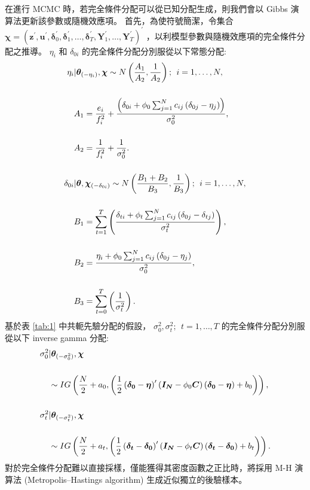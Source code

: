 \documentclass[12pt,a4paper]{article}
\begin{document}
\begin{CJK}{UTF8}{bkai}
在進行 MCMC 時，若完全條件分配可以從已知分配生成，則我們會以 Gibbs 演算法更新該參數或隨機效應項。
首先，為使符號簡潔，令集合 $\bm{\chi} = \left(\bm{z}^\prime,\bm{u}^\prime,\bm{\delta}_0^\prime,\bm{\delta}_1^\prime,\dots,\bm{\delta}_T^\prime,\bm{Y}_1^\prime,\ldots,\bm{Y}_T^\prime\right)^\prime$ ，以利模型參數與隨機效應項的完全條件分配之推導。
 $\eta_i$ 和 $\delta_{0i}$ 的完全條件分配分別服從以下常態分配:
 \begin{align*}
 \setlength\abovedisplayskip{25pt}
 \setlength\belowdisplayskip{25pt}
 \eta_i & |\bm{\theta}_{(-\eta_i)},\bm{\chi} \sim N\left( \frac{A_1}{A_2},\frac{1}{A_2}\right);\:\:i=1,\dots,N, \\[5mm]
 & A_1 = \frac{e_i}{f_i^2} + \frac{\left(\delta_{0i}+\phi_0\sum_{j=1}^N c_{ij}\left(\delta_{0j}-\eta_j\right)\right)}{\sigma_0^2}, \\[5mm]
 & A_2 = \frac{1}{f_i^2}+\frac{1}{\sigma_0^2}.\\[5mm]
 \delta_{0i} & |\bm{\theta},\bm{\chi}_{(-\delta_{0i})} \sim N\left( \frac{B_1+B_2}{B_3},\frac{1}{B_3}\right);\:\:i=1,\dots,N, \\[5mm]
 & B_1 =  \sum_{t=1}^T\left( \frac{\delta_{ti}+\phi_t \sum_{j=1}^N c_{ij}\left( \delta_{0j}-\delta_{tj} \right)}{\sigma_t^2} \right), \\[5mm]
 & B_2 =  \frac{\eta_i+\phi_0 \sum_{j=1}^N c_{ij}\left(\delta_{0j}-\eta_j\right)}{\sigma_0^2}, \\[5mm]
 & B_3 =  \sum_{t=0}^T\left( \frac{1}{\sigma_t^2} \right).
 \end{align*}
\noindent
基於表 \ref{tab:1} 中共軛先驗分配的假設， $\sigma_0^2, \sigma_t^2;\:\:t=1,\dots,T$ 的完全條件分配分別服從以下 inverse gamma 分配:
 \begin{align*}
 \setlength\abovedisplayskip{25pt}
 \setlength\belowdisplayskip{25pt}
\sigma_0^2 & |\bm{\theta}_{(-\sigma_0^2)},\bm{\chi} \\[5mm]
 & \sim IG\left( \frac{N}{2}+a_0,\left( \frac{1}{2}\left(\bm{\delta_0}-\bm{\eta}\right)^\prime\left(\bm{I_N}-\phi_0\bm{C}\right)\left(\bm{\delta_0}-\bm{\eta}\right)+b_0 \right) \right), \\[5mm]
\sigma_t^2 & |\bm{\theta}_{(-\sigma_t^2)},\bm{\chi} \\[5mm]
 & \sim IG\left( \frac{N}{2}+a_t,\left( \frac{1}{2}\left(\bm{\delta_t}-\bm{\delta_0}\right)^\prime\left(\bm{I_N}-\phi_t\bm{C}\right)\left(\bm{\delta_t}-\bm{\delta_0}\right)+b_t \right) \right).
 \end{align*}
\noindent
\noindent
對於完全條件分配難以直接採樣，僅能獲得其密度函數之正比時，將採用 M-H 演算法 (Metropolis--Hastings algorithm) 生成近似獨立的後驗樣本。


\end{CJK}
\end{document}
